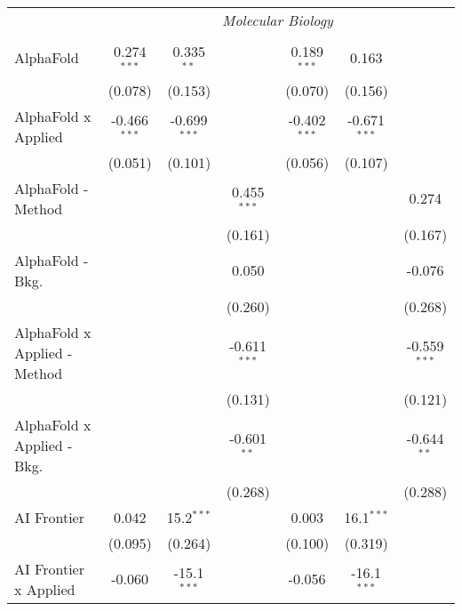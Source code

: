 \begin{tabular}{lcccccc}
 & \multicolumn{6}{c}{\textit{Molecular Biology}} \\ \\
   AlphaFold                      & 0.274$^{***}$  & 0.335$^{**}$   &                & 0.189$^{***}$  & 0.163          &   \\   
                                  & (0.078)        & (0.153)        &                & (0.070)        & (0.156)        &   \\   
   AlphaFold x Applied            & -0.466$^{***}$ & -0.699$^{***}$ &                & -0.402$^{***}$ & -0.671$^{***}$ &   \\   
                                  & (0.051)        & (0.101)        &                & (0.056)        & (0.107)        &   \\   
   AlphaFold - Method             &                &                & 0.455$^{***}$  &                &                & 0.274\\   
                                  &                &                & (0.161)        &                &                & (0.167)\\   
   AlphaFold - Bkg.               &                &                & 0.050          &                &                & -0.076\\   
                                  &                &                & (0.260)        &                &                & (0.268)\\   
   AlphaFold x Applied - Method   &                &                & -0.611$^{***}$ &                &                & -0.559$^{***}$\\   
                                  &                &                & (0.131)        &                &                & (0.121)\\   
   AlphaFold x Applied - Bkg.     &                &                & -0.601$^{**}$  &                &                & -0.644$^{**}$\\   
                                  &                &                & (0.268)        &                &                & (0.288)\\   
   AI Frontier                    & 0.042          & 15.2$^{***}$   &                & 0.003          & 16.1$^{***}$   &   \\   
                                  & (0.095)        & (0.264)        &                & (0.100)        & (0.319)        &   \\   
   AI Frontier x Applied          & -0.060         & -15.1$^{***}$  &                & -0.056         & -16.1$^{***}$  &   \\   

\end{tabular}
